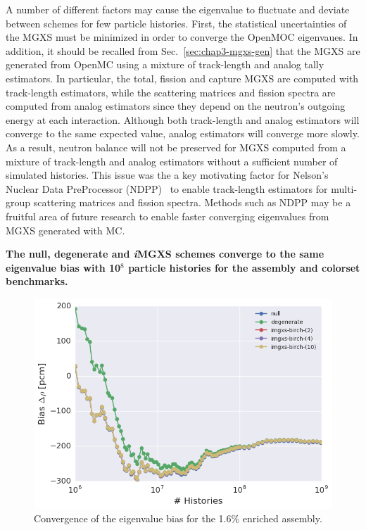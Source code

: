 A number of different factors may cause the eigenvalue to fluctuate and deviate between schemes for few particle histories. First, the statistical uncertainties of the \ac{MGXS} must be minimized in order to converge the OpenMOC eigenvaues. In addition, it should be recalled from Sec.~\ref{sec:chap3-mgxs-gen} that the \ac{MGXS} are generated from OpenMC using a mixture of track-length and analog tally estimators. In particular, the total, fission and capture \ac{MGXS} are computed with track-length estimators, while the scattering matrices and fission spectra are computed from analog estimators since they depend on the neutron's outgoing energy at each interaction. Although both track-length and analog estimators will converge to the same expected value, analog estimators will converge more slowly. As a result, neutron balance will not be preserved for \ac{MGXS} computed from a mixture of track-length and analog estimators without a sufficient number of simulated histories. This issue was the a key motivating factor for Nelson's Nuclear Data PreProcessor (NDPP)~\cite{nelson2014improved} to enable track-length estimators for multi-group scattering matrices and fission spectra. Methods  such as NDPP may be a fruitful area of future research to enable faster converging eigenvalues from \ac{MGXS} generated with \ac{MC}.

\begin{emphbox}
\textbf{The null, degenerate and \textit{i}\ac{MGXS} schemes converge to the same eigenvalue bias with 10$^{8}$ particle histories for the assembly and colorset benchmarks.}
\end{emphbox}


\begin{figure}[h!]
\centering
\includegraphics[width=0.88\linewidth]{figures/results/convergence/assm-16/keff-bias-evo}
\vspace{2mm}
\caption[Eigenvalue bias covergence for a 1.6\% enriched assembly]{Convergence of the eigenvalue bias for the 1.6\% enriched assembly.}
\label{fig:chap11-assm-1.6-eigenvalue-converge}
\end{figure}

